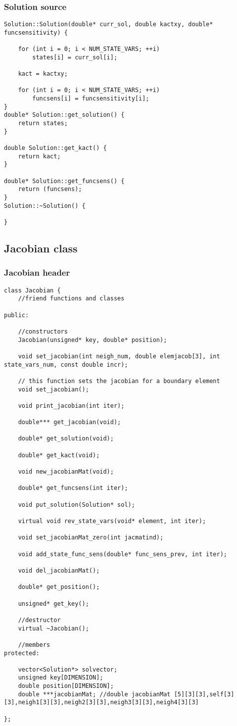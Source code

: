 \documentclass[a4paper,10pt]{article}
\begin{document}
\subsubsection{Solution source}
\begin{lstlisting}
Solution::Solution(double* curr_sol, double kactxy, double* funcsensitivity) {

	for (int i = 0; i < NUM_STATE_VARS; ++i)
		states[i] = curr_sol[i];

	kact = kactxy;

	for (int i = 0; i < NUM_STATE_VARS; ++i)
		funcsens[i] = funcsensitivity[i];
}
double* Solution::get_solution() {
	return states;
}

double Solution::get_kact() {
	return kact;
}

double* Solution::get_funcsens() {
	return (funcsens);
}
Solution::~Solution() {

}
\end{lstlisting}
\subsection{Jacobian class}
\subsubsection{Jacobian header}
\begin{lstlisting}
class Jacobian {
	//friend functions and classes

public:

	//constructors
	Jacobian(unsigned* key, double* position);

	void set_jacobian(int neigh_num, double elemjacob[3], int state_vars_num, const double incr);

	// this function sets the jacobian for a boundary element
	void set_jacobian();

	void print_jacobian(int iter);

	double*** get_jacobian(void);

	double* get_solution(void);

	double* get_kact(void);

	void new_jacobianMat(void);

	double* get_funcsens(int iter);

	void put_solution(Solution* sol);

	virtual void rev_state_vars(void* element, int iter);

	void set_jacobianMat_zero(int jacmatind);

	void add_state_func_sens(double* func_sens_prev, int iter);

	void del_jacobianMat();

	double* get_position();

	unsigned* get_key();

	//destructor
	virtual ~Jacobian();

	//members
protected:

	vector<Solution*> solvector;
	unsigned key[DIMENSION];
	double position[DIMENSION];
	double ***jacobianMat; //double jacobianMat [5][3][3],self[3][3],neigh1[3][3],neigh2[3][3],neigh3[3][3],neigh4[3][3]

};

\end{lstlisting}
\end{document}
